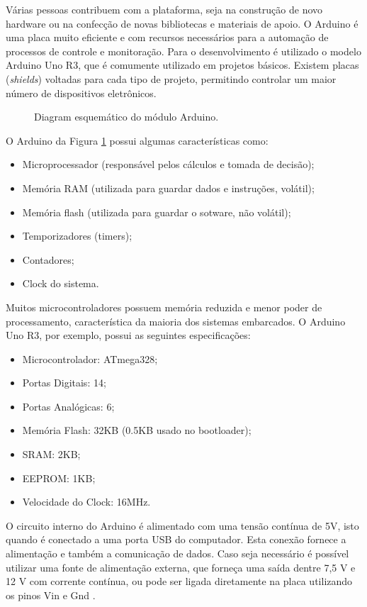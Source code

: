 \documentclass[12pt,report,2019]{uftpibic}
\begin{document}
Várias pessoas contribuem com a plataforma, seja na construção de novo hardware ou na confecção de novas bibliotecas e materiais de apoio. O Arduino é uma placa muito eficiente e com recursos necessários para a automação de processos de controle e monitoração. Para o desenvolvimento é utilizado o modelo Arduino Uno R3, que é comumente utilizado em projetos básicos. Existem placas ({\it shields}) voltadas para cada tipo de projeto, permitindo controlar um maior número de dispositivos eletrônicos.

\begin{figure}[!h]
\centering
\caption{Diagram esquemático do módulo Arduino.}
\label{fig:arduino}
\end{figure}

O Arduino da Figura \ref{fig:arduino} possui algumas características como:

\begin{itemize}
\item Microprocessador (responsável pelos cálculos e tomada de decisão);
\item Memória RAM (utilizada para guardar dados e instruções, volátil);
\item Memória flash (utilizada para guardar o sotware, não volátil);
\item Temporizadores (timers);
\item Contadores;
\item Clock do sistema.
\end{itemize}

Muitos microcontroladores possuem memória reduzida e menor poder de processamento, característica da maioria dos sistemas embarcados. O Arduino Uno R3, por exemplo, possui as seguintes especificações:

\begin{itemize}
\item Microcontrolador: ATmega328;
\item Portas Digitais: 14;
\item Portas Analógicas: 6;
\item Memória Flash: 32KB (0.5KB usado no bootloader);
\item SRAM: 2KB;
\item EEPROM: 1KB;
\item Velocidade do Clock: 16MHz.
\end{itemize}

O circuito interno do Arduino é alimentado com uma tensão contínua de 5V, isto quando é conectado a uma porta USB do computador. Esta conexão fornece a alimentação e também a comunicação de dados. Caso seja necessário é possível utilizar uma fonte de alimentação externa, que forneça uma saída dentre 7,5 V e 12 V com corrente contínua, ou pode ser ligada diretamente na placa utilizando os pinos Vin e Gnd \cite{marcos}.
\end{document}
